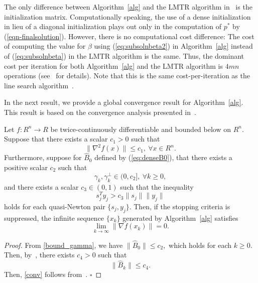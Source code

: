 The only difference between Algorithm~\ref{alg} and the %
{\small LMTR} algorithm in~\cite{BurdakovLMTR16} is the initialization
matrix.  Computationally speaking, the use of a dense initialization
in lieu of a diagonal initialization plays out only in the computation
of $p^*$ by (\ref{eqn-finalsolution}).  However, there is no
computational cost difference: The cost of computing the value for
$\beta$ using (\ref{eq:subsolnbeta2}) in Algorithm~\ref{alg} instead
of (\ref{eq:subsolnbeta}) in the {\small LMTR} algorithm is the same.
Thus, the dominant cost per iteration for both Algorithm~\ref{alg} and
the {\small LMTR} algorithm is $4mn$ operations
(see~\cite{BurdakovLMTR16} for details).  Note that this is the same
cost-per-iteration as the line search \LBFGS{}
algorithm~\cite{ByrNS94}.

\medskip

In the next result, we provide a global convergence result for
Algorithm~\ref{alg}.  This result is based on the convergence analysis
presented in~\cite{BurdakovLMTR16}.

\begin{theorem}\label{th_conv}
Let  $f:R^n\rightarrow R$ be twice-continuously differentiable and bounded below on $R^n$. Suppose that there exists a scalar $c_1>0$ such that 
\begin{equation}\label{bound_hessian}
\|\nabla^2f(x)\|\leq c_1, \ \forall x \in R^n.
\end{equation}
Furthermore, suppose for $\hat{B}_0$ defined by (\ref{eq:denseB0}), that there exists a positive scalar $c_2$ such that
\begin{equation}\label{bound_gamma}
\gamma_k , \gamma_k^{\perp} \in (0,c_2], \ \forall k\ge 0,
\end{equation}
and there exists a scalar $c_3 \in (0,1)$ such that the inequality
\begin{equation}\label{bound_sy}
s_j^T y_j >   c_3 \|s_j\| \|y_j\|
\end{equation} 
holds for each quasi-Newton pair $\{s_j, y_j\}$. 
Then, if the
stopping criteria is suppressed, the infinite sequence $\{x_k\}$
generated by Algorithm~\ref{alg}
satisfies \begin{equation}\label{conv}
\lim _{k\rightarrow \infty} \|\nabla f(x_k)\| = 0.
\end{equation}
\end{theorem}
\begin{proof}
From \eqref{bound_gamma}, we have 
$\|\hat{B}_0\| \le c_2,$ which
holds for each $k \ge 0$.  Then,
by~\cite[Lemma~3]{BurdakovLMTR16}, there exists $c_4 > 0$ such that 
$$
\|\hat{B}_k\| \le c_4.
$$
Then, \eqref{conv} follows from~\cite[Theorem~1]{BurdakovLMTR16}. $\square$
\end{proof}

